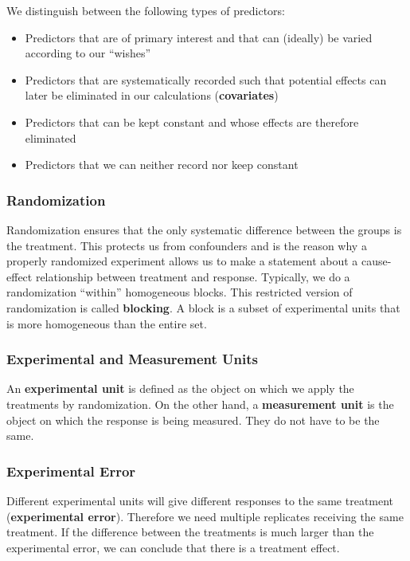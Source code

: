 We distinguish between the following types of predictors:

\begin{itemize}
	\item Predictors that are of primary interest and that can (ideally) be varied according to our “wishes”
	\item Predictors that are systematically recorded such that potential effects can later be eliminated in our calculations (\textbf{covariates})
	\item Predictors that can be kept constant and whose effects are therefore eliminated
	\item Predictors that we can neither record nor keep constant
\end{itemize}

\subsubsection{Randomization}

Randomization ensures that the only systematic difference between the groups is the treatment. This protects us from confounders and is the reason why a properly randomized experiment allows us to make a statement about a cause-effect relationship between treatment and response. Typically, we do a randomization “within” homogeneous blocks. This restricted version of randomization is called \textbf{blocking}. A block is a subset of experimental units that is more homogeneous than the entire set.

\subsubsection{Experimental and Measurement Units}

An \textbf{experimental unit} is defined as the object on which we apply the treatments by randomization. On the other hand, a \textbf{measurement unit} is the object on which the response is being measured. They do not have to be the same.

\subsubsection{Experimental Error}

Different experimental units will give different responses to the same treatment (\textbf{experimental error}). Therefore we need multiple replicates receiving the same treatment. If the difference between the treatments is much larger than the experimental error, we can conclude that there is a treatment effect.

